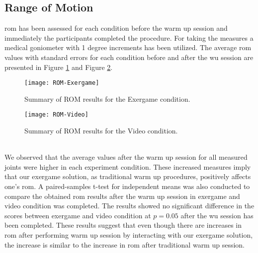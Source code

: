\subsection{Range of Motion}
\gls{rom} has been assessed  for each condition before the warm up session and immediately the participants completed the procedure. For taking the measures a medical goniometer with 1 degree increments has been utilized. The average \acrshort{rom} values with standard errors for each condition before  and after the \acrshort{wu} session are presented in Figure \ref{fig:romExperiment} and Figure \ref{fig:romControl}. \\
\begin{figure}[h]
    \centering
    \texttt{[image: ROM-Exergame]}
    \caption{Summary of ROM results for the Exergame condition.}
    \label{fig:romExperiment}
\end{figure}
\begin{figure}[h]
    \centering
    \texttt{[image: ROM-Video]}
    \caption{Summary of ROM results for the Video condition.}
    \label{fig:romControl}
\end{figure}\\
We observed that the average values after the warm up session for all measured joints were higher in each experiment condition. These increased measures imply that our exergame solution, as traditional warm up procedures, positively affects one's \acrshort{rom}. A paired-samples t-test for independent means was also conducted to compare the obtained \acrshort{rom} results after the warm up session in exergame and video condition was completed. The results showed no significant difference in the scores between exergame and video condition at \begin{math}p = 0.05\end{math} after the \acrshort{wu} session has been completed. These results suggest that even though there are increases in \acrshort{rom} after performing warm up session by interacting with our exergame solution, the increase is similar to the increase in \acrshort{rom} after traditional warm up session. 
